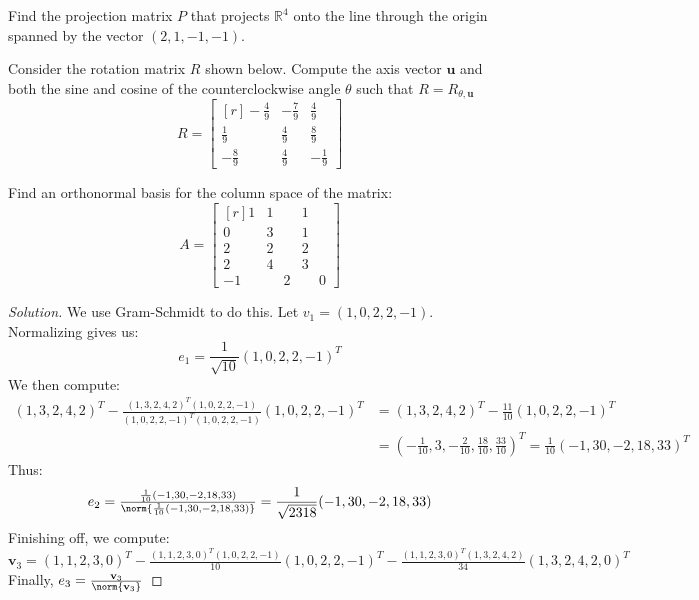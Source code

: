 \documentclass[crop=false,class=book,oneside]{standalone}
\begin{document}
        \begin{problem}
        Find the projection matrix $P$ that projects $\mathbb{R}^4$ onto the line through the origin spanned by the vector $(2,1,-1,-1)$.
        \end{problem}
        \begin{problem}
        Consider the rotation matrix $R$ shown below. Compute the axis vector $\textbf{u}$ and both the sine and cosine of the counterclockwise angle $\theta$ such that $R = R_{\theta,\textbf{u}}$
        \begin{equation*}
            R = \begin{bmatrix*}[r] -\frac{4}{9} & -\frac{7}{9} & \frac{4}{9} \\ \frac{1}{9} & \frac{4}{9} & \frac{8}{9} \\ -\frac{8}{9} & \frac{4}{9} & -\frac{1}{9} \end{bmatrix*}
        \end{equation*}
        \end{problem}
        \begin{problem}
        Find an orthonormal basis for the column space of the matrix:
        \begin{equation*}
            A = \begin{bmatrix*}[r] 1 & 1 & 1 \\ 0 & 3 & 1 \\ 2 & 2 & 2 \\ 2 & 4 & 3 \\ -1 & \phantom{-}2 & \phantom{-}0 \end{bmatrix*}
        \end{equation*}
        \end{problem}
        \begin{proof}[Solution]
        We use Gram-Schmidt to do this. Let $v_{1}=(1,0,2,2,-1)$. Normalizing gives us:
        \begin{equation*}
            e_{1} = \frac{1}{\sqrt{10}}(1,0,2,2,-1)^T    
        \end{equation*}
        We then compute:
        \begin{align*}
            (1,3,2,4,2)^T-\tfrac{(1,3,2,4,2)^T(1,0,2,2,-1)}{(1,0,2,2,-1)^T (1,0,2,2,-1)}(1,0,2,2,-1)^{T}&=(1,3,2,4,2)^{T}-\tfrac{11}{10}(1,0,2,2,-1)^{T}\\
            &=(-\tfrac{1}{10},3,-\tfrac{2}{10},\tfrac{18}{10},\tfrac{33}{10})^{T}=\tfrac{1}{10}(-1,30,-2,18,33)^{T}
        \end{align*}
        Thus:
        \begin{equation*}
            e_{2}=\tfrac{\frac{1}{10}(-1,30,-2,18,33)}{\norm{\frac{1}{10}(-1,30,-2,18,33)}}=\frac{1}{\sqrt{2318}}(-1,30,-2,18,33)
        \end{equation*}
        Finishing off, we compute:
        \begin{equation*}
            \mathbf{v}_{3}=(1,1,2,3,0)^{T}-\tfrac{(1,1,2,3,0)^T(1,0,2,2,-1)}{10}(1,0,2,2,-1)^T-\tfrac{(1,1,2,3,0)^T(1,3,2,4,2)}{34}(1,3,2,4,2,0)^{T}
        \end{equation*}
        Finally, $e_3=\frac{\textbf{v}_{3}}{\norm{\textbf{v}_{3}}}$
        \end{proof}
\end{document}
